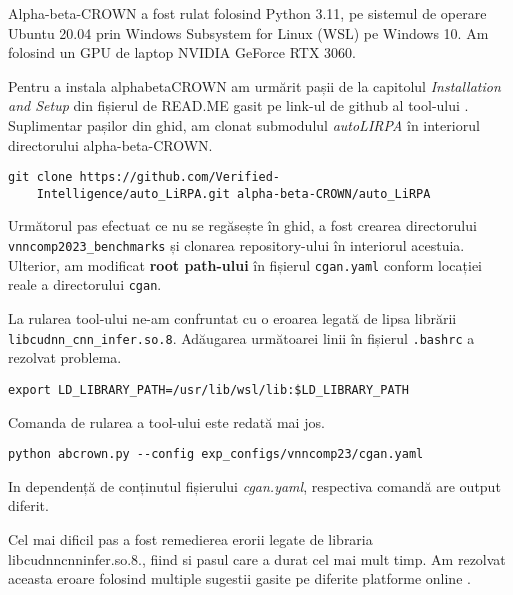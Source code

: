 Alpha-beta-CROWN a fost rulat folosind Python 3.11,  pe sistemul de operare Ubuntu 20.04 prin Windows Subsystem for Linux (WSL) pe Windows 10. Am folosind un GPU de laptop NVIDIA GeForce RTX 3060.

Pentru a instala alpha\textunderscore beta\textunderscore CROWN am urmărit pașii de la capitolul \textit{Installation and Setup} din fișierul de READ.ME gasit pe link-ul de github al tool-ului \cite{read_abc.md}. 
Suplimentar pașilor din ghid, am clonat submodulul \textit{auto\textunderscore LIRPA} în interiorul directorului alpha-beta-CROWN. 
    \begin{lstlisting}[style=bashstyle]
    git clone https://github.com/Verified-
    Intelligence/auto_LiRPA.git alpha-beta-CROWN/auto_LiRPA
   \end{lstlisting}

Următorul pas efectuat ce nu se regăsește în ghid, a fost crearea directorului \texttt{vnncomp2023\_benchmarks} și clonarea repository-ului \cite{cganrepository} în interiorul acestuia. Ulterior, am modificat \textbf{root path-ului} în fișierul \texttt{cgan.yaml} conform locației reale a directorului \texttt{cgan}.

La rularea tool-ului ne-am confruntat cu o eroarea legată de lipsa librării \texttt{libcudnn\_cnn\_infer.so.8}. Adăugarea următoarei linii în fișierul \texttt{.bashrc} a rezolvat problema.
  \begin{lstlisting}[style=bashstyle]
    export LD_LIBRARY_PATH=/usr/lib/wsl/lib:$LD_LIBRARY_PATH
  \end{lstlisting}
  
Comanda de rularea a tool-ului este redată mai jos.
  \begin{lstlisting}[style=bashstyle]
    python abcrown.py --config exp_configs/vnncomp23/cgan.yaml
  \end{lstlisting}
In dependență de conținutul fișierului \textit{cgan.yaml}, respectiva comandă are output diferit.

Cel mai dificil pas a fost remedierea erorii legate de libraria libcudnn\textunderscore cnn\textunderscore infer.so.8., fiind si pasul care a durat cel mai mult timp. Am rezolvat aceasta eroare folosind multiple sugestii gasite pe diferite platforme online \cite{bashrcfix}.
